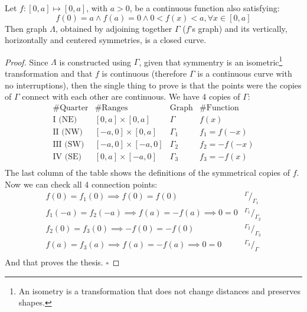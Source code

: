 \begin{lemma}
\label{lem:lclosed}
Let $f:[0,a] \mapsto [0,a]$, with $a > 0$, be a continuous function also satisfying:
\begin{equation}
\label{eq:fconds}
f(0)=a \wedge f(a)=0 \wedge 0 < f(x) < a, \forall x \in [0,a]
\end{equation}
Then graph $\Lambda$, obtained by adjoining together $\Gamma$ ($f$'s graph) and
its vertically, horizontally and centered symmetries, is a closed curve.
\begin{proof}
Since $\Lambda$ is constructed using $\Gamma$, given that symmentry is an 
isometric\footnote{An isometry is a transformation that does not change distances and
preserves shapes.} 
transformation and that $f$ is continuous (therefore $\Gamma$ is a continuous curve
with no interruptions), then the single thing to prove is that the points were
the copies of $\Gamma$ connect with each other are continuous. We have 4
copies of $\Gamma$:
\begin{equation*}
\begin{array}{c|c|c|c}
\text{\# Quarter} & \text{\# Ranges} & \text{Graph} & \text{\# Function} \\
\hline
\text{I (NE)} & [0,a] \times [0,a] & \Gamma & f(x) \\
\text{II (NW)} & [-a,0] \times [0,a] & \Gamma_1 & f_1 = f(-x) \\
\text{III (SW)} & [-a,0] \times [-a,0] & \Gamma_2 & f_2 = -f(-x) \\
\text{IV (SE)} & [0,a] \times [-a,0] & \Gamma_3 & f_3 = -f(x) \\
\end{array}
\end{equation*}
The last column of the table shows the definitions of the symmetrical copies of $f$.
Now we can check all 4 connection points:
\begin{equation}\label{eq:symms}
\begin{array}{l|c}
f(0) = f_1(0) \implies f(0) = f(0) & ^{\Gamma}/_{\Gamma_1} \\
f_1(-a) = f_2(-a) \implies f(a) = -f(a) \implies 0 = 0 & ^{\Gamma_1}/_{\Gamma_2} \\
f_2(0) = f_3(0) \implies -f(0) = -f(0) & ^{\Gamma_2}/_{\Gamma_3} \\
f(a) = f_3(a) \implies f(a) = -f(a) \implies 0 = 0 & ^{\Gamma_3}/_{\Gamma} \\
\end{array}
\end{equation}
And that proves the thesis.
$\square$
\end{proof}
\end{lemma}

